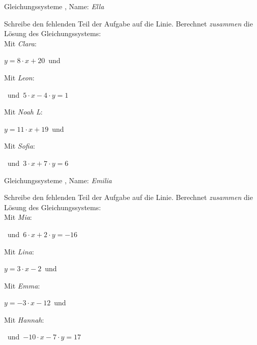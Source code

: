\newpage
\begin{center}\large Gleichungssysteme
, Name: \emph{Ella}\end{center}
Schreibe den fehlenden Teil der Aufgabe auf die Linie. Berechnet \emph{zusammen} die Lösung des Gleichungssystems:
\\
\vfill Mit \emph{Clara}:
\begin{center}$y=8\cdot x+20$\mbox{ }und\mbox{ }\underline{}
\end{center}
\vfill Mit \emph{Leon}:
\begin{center}\underline{}
\mbox{ }und\mbox{ }$5\cdot x-4\cdot y=1$\end{center}
\vfill Mit \emph{Noah L}:
\begin{center}$y=11\cdot x+19$\mbox{ }und\mbox{ }\underline{}
\end{center}
\vfill Mit \emph{Sofia}:
\begin{center}\underline{}
\mbox{ }und\mbox{ }$3\cdot x+7\cdot y=6$\end{center}
\newpage
\begin{center}\large Gleichungssysteme
, Name: \emph{Emilia}\end{center}
Schreibe den fehlenden Teil der Aufgabe auf die Linie. Berechnet \emph{zusammen} die Lösung des Gleichungssystems:
\\
\vfill Mit \emph{Mia}:
\begin{center}\underline{}
\mbox{ }und\mbox{ }$6\cdot x+2\cdot y=-16$\end{center}
\vfill Mit \emph{Lina}:
\begin{center}$y=3\cdot x-2$\mbox{ }und\mbox{ }\underline{}
\end{center}
\vfill Mit \emph{Emma}:
\begin{center}$y=-3\cdot x-12$\mbox{ }und\mbox{ }\underline{}
\end{center}
\vfill Mit \emph{Hannah}:
\begin{center}\underline{}
\mbox{ }und\mbox{ }$-10\cdot x-7\cdot y=17$\end{center}
